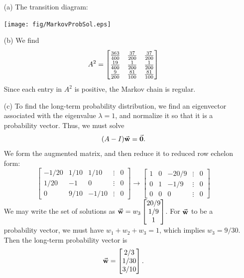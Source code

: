 \begin{enumerate}
\item[(a)] The transition diagram:

\medskip
\centerline{%
\texttt{[image: fig/MarkovProbSol.eps]}
}
\medskip

\item[(b)]
We find
\[
  A^2= \begin{bmatrix}
           \frac{363}{400} & \frac{37}{200} & \frac{37}{200} \T\B \\
	   \frac{19}{400} & \frac{1}{200}   & \frac{1}{200} \B  \\
	   \frac{9}{200}    & \frac{81}{100} & \frac{81}{100} \B
      \end{bmatrix}
\]
Since each entry in $A^2$ is positive, the Markov chain is regular.
\item[(c)]
To find the long-term probability distribution, we find an eigenvector
associated with the eigenvalue $\lambda=1$, and normalize it so that
it is a probability vector.
Thus, we must solve
\[
  (A-I)\vec{\textbf{w}} = \vec{\textbf{0}}.
\]
We form the augmented matrix,
and then reduce it to reduced row echelon form:
{\small
\[
\begin{bmatrix}
   -1/20 & 1/10 & 1/10 & \vdots & 0 \\
   1/20  &   -1  &  0   & \vdots & 0 \\
   0     &  9/10 & -1/10 & \vdots & 0
\end{bmatrix}
\rightarrow
\begin{bmatrix}
   1  &   0  & -20/9  & \vdots & 0 \\
   0  &   1  & -1/9   & \vdots & 0 \\
   0  &   0  &  0     & \vdots & 0
\end{bmatrix}
\]
}
We may write
the set of solutions as
$\vec{\textbf{w}} = w_3 \begin{bmatrix}
                 20/9 \\ 1/9 \\ 1
             \end{bmatrix}$.
For $\vec{\textbf{w}}$ to be a probability vector, we must have $w_1+w_2+w_3=1$,
which implies $w_3 = 9/30$.  Then the long-term probability vector
is
\[
  \vec{\textbf{w}} = \begin{bmatrix}
           2/3 \\ 1/30 \\ 3/10
        \end{bmatrix} .
\]
\end{enumerate}

